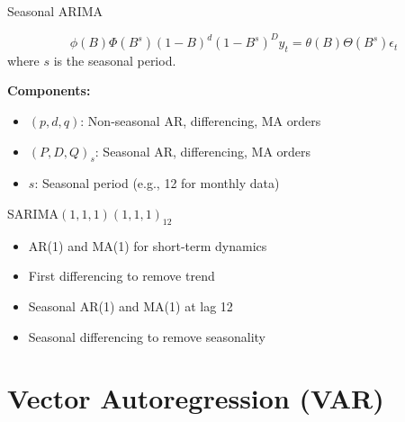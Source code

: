 \documentclass[aspectratio=169]{beamer}
\begin{document}
\begin{frame}{Seasonal ARIMA}
  \begin{definitionbox}[title={SARIMA$(p,d,q)(P,D,Q)_s$ Model}]
    \begin{equation}
      \phi(B)\Phi(B^s)(1-B)^d(1-B^s)^D y_t = \theta(B)\Theta(B^s)\epsilon_t
    \end{equation}
    where $s$ is the seasonal period.
  \end{definitionbox}

  \vspace{0.5em}

  \textbf{Components:}
  \begin{itemize}
    \item $(p,d,q)$: Non-seasonal AR, differencing, MA orders
    \item $(P,D,Q)_s$: Seasonal AR, differencing, MA orders
    \item $s$: Seasonal period (e.g., 12 for monthly data)
  \end{itemize}

  \vspace{0.5em}

  \begin{examplebox}[title={Example: Monthly Sales}]
    SARIMA$(1,1,1)(1,1,1)_{12}$
    \begin{itemize}
      \item AR(1) and MA(1) for short-term dynamics
      \item First differencing to remove trend
      \item Seasonal AR(1) and MA(1) at lag 12
      \item Seasonal differencing to remove seasonality
    \end{itemize}
  \end{examplebox}
\end{frame}

\section{Vector Autoregression (VAR)}
\end{document}
